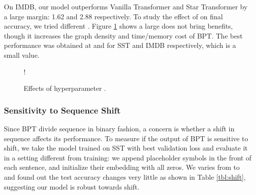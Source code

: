 \documentclass[11pt,a4paper]{article}
\begin{document}
On IMDB, our model outperforms Vanilla Transformer and Star Transformer by a large margin: 1.62 and 2.88 respectively. To study the effect of  on final accuracy, we tried different . Figure \ref{fig:bpt-cls} shows a large  does not bring benefits, though it increases the graph density and time/memory cost of BPT. The best performance was obtained at  and  for SST and IMDB respectively, which is a small value.

\begin{figure}[!htb]
    \centering
\resizebox {1.0\linewidth} {!} {
}
    \caption{Effects of hyperparameter .}
    \label{fig:bpt-cls}
\end{figure}



\subsubsection{Sensitivity to Sequence Shift}
Since BPT divide sequence in binary fashion, a concern is whether a shift in sequence affects its performance. To measure if the output of BPT is sensitive to shift, we take the model trained on SST with best validation loss and evaluate it in a setting different from training: we append  placeholder symbols in the front of each sentence, and initialize their embedding with all zeros. We varies  from  to  and found out the test accuracy changes very little as shown in Table \ref{tbl:shift}, suggesting our model is robust towards shift.
\end{document}
